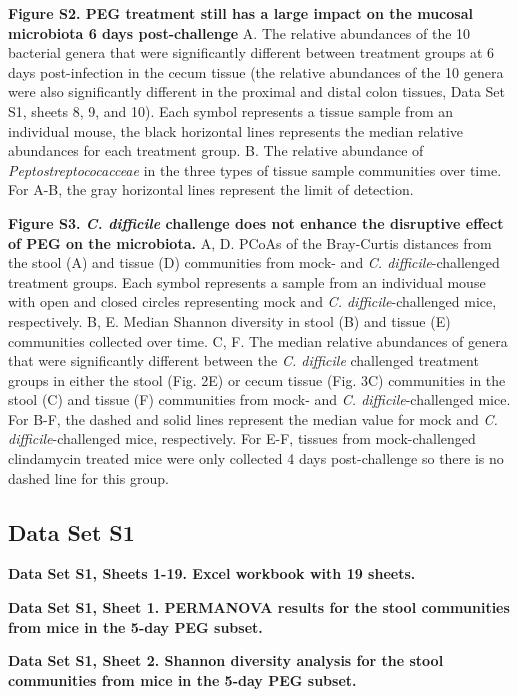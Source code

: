 \documentclass[
  11pt,
]{article}
\begin{document}
\textbf{Figure S2. PEG treatment still has a large impact on the mucosal
microbiota 6 days post-challenge} A. The relative abundances of the 10
bacterial genera that were significantly different between treatment
groups at 6 days post-infection in the cecum tissue (the relative
abundances of the 10 genera were also significantly different in the
proximal and distal colon tissues, Data Set S1, sheets 8, 9, and 10).
Each symbol represents a tissue sample from an individual mouse, the
black horizontal lines represents the median relative abundances for
each treatment group. B. The relative abundance of
\emph{Peptostreptococacceae} in the three types of tissue sample
communities over time. For A-B, the gray horizontal lines represent the
limit of detection. \newpage

\textbf{Figure S3. \emph{C. difficile} challenge does not enhance the
disruptive effect of PEG on the microbiota.} A, D. PCoAs of the
Bray-Curtis distances from the stool (A) and tissue (D) communities from
mock- and \emph{C. difficile}-challenged treatment groups. Each symbol
represents a sample from an individual mouse with open and closed
circles representing mock and \emph{C. difficile}-challenged mice,
respectively. B, E. Median Shannon diversity in stool (B) and tissue (E)
communities collected over time. C, F. The median relative abundances of
genera that were significantly different between the \emph{C. difficile}
challenged treatment groups in either the stool (Fig. 2E) or cecum
tissue (Fig. 3C) communities in the stool (C) and tissue (F) communities
from mock- and \emph{C. difficile}-challenged mice. For B-F, the dashed
and solid lines represent the median value for mock and \emph{C.
difficile}-challenged mice, respectively. For E-F, tissues from
mock-challenged clindamycin treated mice were only collected 4 days
post-challenge so there is no dashed line for this group. \newpage

\hypertarget{data-set-s1}{%
\subsection{Data Set S1}\label{data-set-s1}}

\textbf{Data Set S1, Sheets 1-19. Excel workbook with 19 sheets.}

\textbf{Data Set S1, Sheet 1. PERMANOVA results for the stool
communities from mice in the 5-day PEG subset.}

\textbf{Data Set S1, Sheet 2. Shannon diversity analysis for the stool
communities from mice in the 5-day PEG subset.}
\end{document}
